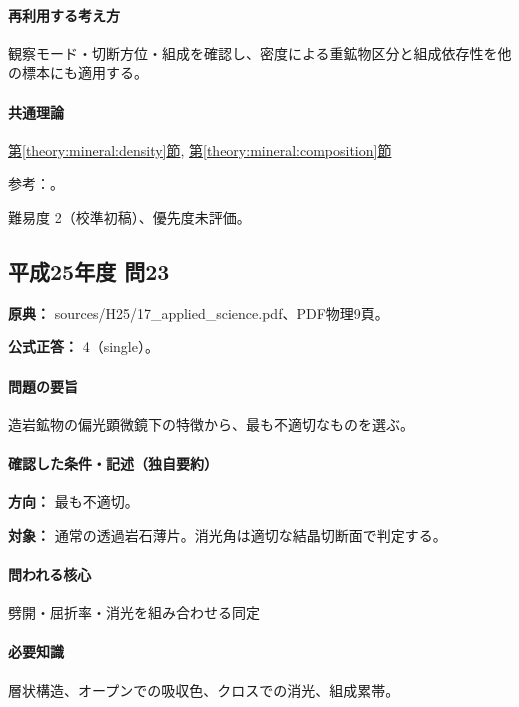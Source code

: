 \paragraph{再利用する考え方} 観察モード・切断方位・組成を確認し、密度による重鉱物区分と組成依存性を他の標本にも適用する。

\paragraph{共通理論} \hyperref[theory:mineral:density]{第\ref*{theory:mineral:density}節}, \hyperref[theory:mineral:composition]{第\ref*{theory:mineral:composition}節}

\par 参考：\cite{hom_biotite,hom_quartz,hom_forsterite,hom_augite,hom_magnetite}。

\par 難易度 2（校準初稿）、優先度未評価。

\subsection{平成25年度 問23}
\label{q:h25-reg-applied-23}

\noindent\textbf{原典：} sources/H25/17\_applied\_science.pdf、PDF物理9頁。

\textbf{公式正答：} 4（single）。

\paragraph{問題の要旨} 造岩鉱物の偏光顕微鏡下の特徴から、最も不適切なものを選ぶ。

\paragraph{確認した条件・記述（独自要約）}\mbox{}\par

\noindent\textbf{方向：} 最も不適切。\par

\noindent\textbf{対象：} 通常の透過岩石薄片。消光角は適切な結晶切断面で判定する。\par

\paragraph{問われる核心} 劈開・屈折率・消光を組み合わせる同定

\paragraph{必要知識} 層状構造、オープンでの吸収色、クロスでの消光、組成累帯。

